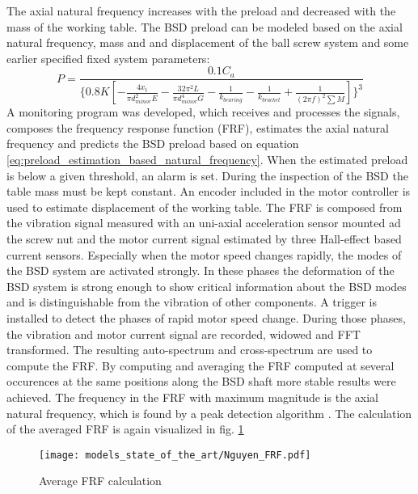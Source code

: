 The axial natural frequency increases with the preload and decreased with the mass of the working table. The BSD preload can be modeled based on the axial natural frequency, mass and and displacement of the ball screw system and some earlier specified fixed system parameters:
\begin{equation}
    P=\frac{0.1C_{a}}{\{0.8K[ -\frac{4x_{t}}{\pi d_{minor}^{2}E} -\frac{32\pi^{2}L}{\pi d_{minor}^{4}G}-\frac{1}{k_{bearing}}-\frac{1}{k_{bracket}}+\frac{1}{(2\pi f)^{2}\sum M} ]\}^{3}}
\end{equation} \label{eq:preload_estimation_based_natural_frequency}
A monitoring program was developed, which receives and processes the signals, composes the frequency response function (FRF), estimates the axial natural frequency and predicts the BSD preload based on equation \ref{eq:preload_estimation_based_natural_frequency}. When the estimated preload is below a given threshold, an alarm is set. During the inspection of the BSD the table mass must be kept constant. An encoder included in the motor controller is used to estimate displacement of the working table. The FRF is composed from the vibration signal measured with an uni-axial acceleration sensor mounted ad the screw nut and the motor current signal estimated by three Hall-effect based current sensors. Especially when the motor speed changes rapidly, the modes of the BSD system are activated strongly. In these phases the deformation of the BSD system is strong enough to show critical information about the BSD modes and is distinguishable from the vibration of other components. A trigger is installed to detect the phases of rapid motor speed change. During those phases, the vibration and motor current signal are recorded, widowed and FFT transformed. The resulting auto-spectrum and cross-spectrum are used to compute the FRF. By computing and averaging the FRF computed at several occurences at the same positions along the BSD shaft more stable results were achieved. The frequency in the FRF with maximum magnitude is the axial natural frequency, which is found by a peak detection algorithm \cite{NGUYEN2019}. The calculation of the averaged FRF is again visualized in fig. \ref{fig:Nguyen_frf}

\begin{figure}[H]
  \centering
  \texttt{[image: models\_state\_of\_the\_art/Nguyen\_FRF.pdf]}
  \caption{Average FRF calculation \cite{NGUYEN2019}}
  \label{fig:Nguyen_frf}
\end{figure}

